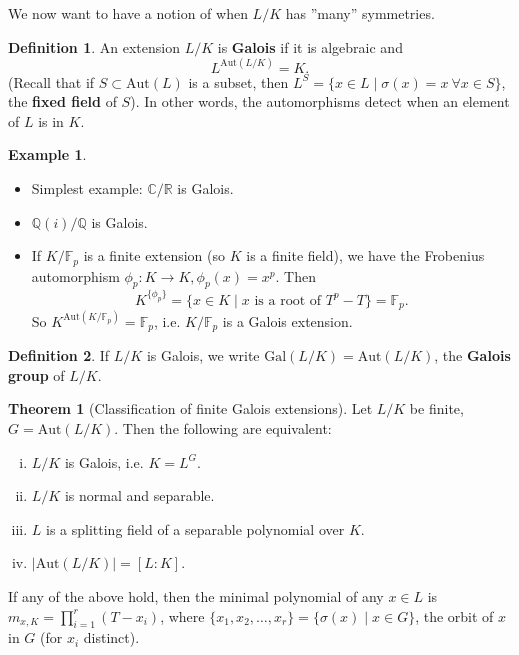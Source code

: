 \documentclass{article}
\theoremstyle{definition}
\newtheorem{theorem}{Theorem}[section]
\newtheorem{example}{Example}[section]
\newtheorem{defn}{Definition}[section]
\begin{document}
We now want to have a notion of when $L/K$ has ''many'' symmetries.
\begin{defn}
    An extension $L/K$ is \textbf{Galois} if it is algebraic and $$L^{\text{Aut}(L/K)}=K.$$ (Recall that if $S \subset \text{Aut}(L)$ is a subset, then $L^S = \{x \in L \mid \sigma(x)=x ~\forall x \in S\}$, the \textbf{fixed field} of $S$). In other words, the automorphisms detect when an element of $L$ is in $K$.
\end{defn}
\begin{example}
    \begin{itemize}
        \item Simplest example: $\mathbb{C}/\mathbb{R}$ is Galois.
        \item $\mathbb{Q}(i)/\mathbb{Q}$ is Galois.
        \item If $K/\mathbb{F}_p$ is a finite extension (so $K$ is a finite field), we have the Frobenius automorphism $\phi_p : K \to K, \phi_p(x)=x^p$. Then \[
        K^{\{\phi_p\}} = \{x \in K \mid x \text{ is a root of }T^p-T\} = \mathbb{F}_p.
        \]
        So $K^{\text{Aut}(K/\mathbb{F}_p)} = \mathbb{F}_p$, i.e. $K/\mathbb{F}_p$ is a Galois extension.
    \end{itemize}
\end{example}
\begin{defn}
    If $L/K$ is Galois, we write $\text{Gal}(L/K) = \text{Aut}(L/K)$, the \textbf{Galois group} of $L/K$.
\end{defn}
\begin{theorem}[Classification of finite Galois extensions]\label{9.2}
    Let $L/K$ be finite, $G = \text{Aut}(L/K)$. Then the following are equivalent:
    \begin{enumerate}[(i)]
        \item $L/K$ is Galois, i.e. $K=L^G$.
        \item $L/K$ is normal and separable.
        \item $L$ is a splitting field of a separable polynomial over $K$.
        \item $|\text{Aut}(L/K)|=[L:K]$.
    \end{enumerate}
    If any of the above hold, then the minimal polynomial of any $x \in L$ is $m_{x,K}=\prod_{i=1}^{r} (T-x_i)$, where $\{x_1,x_2,\ldots,x_r\} = \{\sigma(x) \mid  x \in G\}$, the orbit of $x$ in $G$ (for $x_i$ distinct).
\end{theorem}
\end{document}
